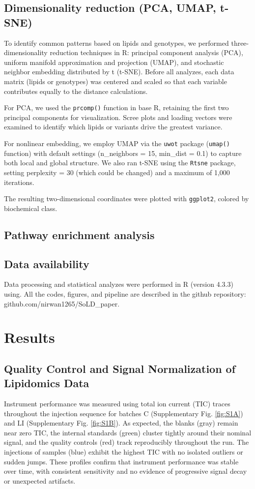 \documentclass[10pt,letterpaper]{article}
\begin{document}
\subsection*{Dimensionality reduction (PCA, UMAP, t-SNE)}  
To identify common patterns based on lipids and genotypes, we performed three-dimensionality reduction techniques in R: principal component analysis (PCA), uniform manifold approximation and projection (UMAP), and stochastic neighbor embedding distributed by t (t-SNE).  Before all analyzes, each data matrix (lipids or genotypes) was centered and scaled so that each variable contributes equally to the distance calculations.

For PCA, we used the \texttt{prcomp()} function in base R, retaining the first two principal components for visualization.  Scree plots and loading vectors were examined to identify which lipids or variants drive the greatest variance.  

For nonlinear embedding, we employ UMAP via the \texttt{uwot} package (\texttt{umap()} function) with default settings (n\_neighbors = 15, min\_dist = 0.1) to capture both local and global structure.  We also ran t-SNE using the \texttt{Rtsne} package, setting perplexity = 30 (which could be changed) and a maximum of 1,000 iterations.  

The resulting two-dimensional coordinates were plotted with \texttt{ggplot2}, colored by biochemical class.

\subsection*{Pathway enrichment analysis}

\subsection*{Data availability}
Data processing and statistical analyzes were performed in R (version 4.3.3) using. All the codes, figures, and pipeline are described in the github repository: github.com/nirwan1265/SoLD_paper.

\section*{Results}

\subsection*{Quality Control and Signal Normalization of Lipidomics Data}
Instrument performance was measured using total ion current (TIC) traces throughout the injection sequence for batches C (Supplementary Fig. \ref{fig:S1A}) and LI (Supplementary Fig. \ref{fig:S1B}). As expected, the blanks (gray) remain near zero TIC, the internal standards (green) cluster tightly around their nominal signal, and the quality controls (red) track reproducibly throughout the run. The injections of samples (blue) exhibit the highest TIC with no isolated outliers or sudden jumps. These profiles confirm that instrument performance was stable over time, with consistent sensitivity and no evidence of progressive signal decay or unexpected artifacts.
\end{document}

